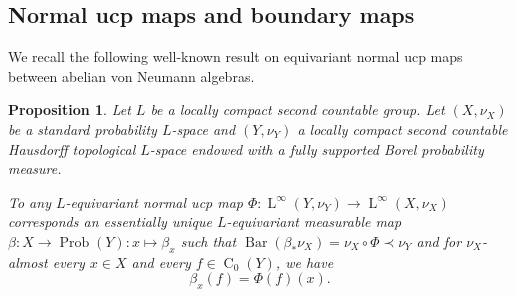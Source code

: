 \documentclass[11pt]{amsart}
\numberwithin{equation}{section}
\theoremstyle{plain}
\newtheorem{prop}[thm]{Proposition}
\theoremstyle{definition}
\newcommand{\Prob}{\operatorname{Prob}}
\newcommand{\bary}{\operatorname{Bar}}
\newcommand{\rC}{\operatorname{C}}
\newcommand{\rL}{\operatorname{ L}}
\begin{document}
\subsection{Normal ucp maps and boundary maps}

We recall the following well-known result on equivariant normal ucp maps between abelian von Neumann algebras.

\begin{prop}\label{prop-ucp}
Let $L$ be a locally compact second countable group. Let $(X, \nu_X)$ be a standard probability $L$-space and $(Y, \nu_Y)$ a locally compact second countable Hausdorff topological $L$-space endowed with a fully supported Borel probability measure. 

To any $L$-equivariant normal ucp map $\Phi : \rL^\infty(Y, \nu_Y) \to \rL^\infty(X, \nu_X)$ corresponds an essentially unique $L$-equivariant measurable map $\beta : X \to \Prob(Y) : x \mapsto \beta_x$ such that $\bary(\beta_\ast \nu_X) = \nu_X \circ \Phi \prec \nu_Y$ and for $\nu_X$-almost every $x \in X$ and every $f \in \rC_0(Y)$, we have 
$$\beta_x(f) = \Phi(f)(x).$$
\end{prop}
\end{document}
